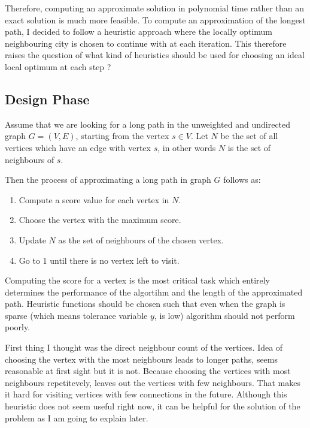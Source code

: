 \documentclass[12pt]{report}
\begin{document}
            Therefore, computing an approximate solution in polynomial time rather than an exact solution is much more feasible. To compute an approximation of the
            longest path, I decided to follow a heuristic approach where the locally optimum neighbouring city is chosen to continue with at each iteration. This therefore
            raises the question of what kind of heuristics should be used for choosing an ideal local optimum at each step ?

        \subsection{Design Phase}
            
            Assume that we are looking for a long path in the unweighted and undirected graph $G=(V,E)$, starting from the vertex $s \in V$. Let $N$ be the set of all vertices
            which have an edge with vertex $s$, in other words $N$ is the set of neighbours of $s$. 
            \newline

            Then the process of approximating a long path in graph $G$ follows as:

            \begin{enumerate}
                \item Compute a score value for each vertex in $N$.
                \item Choose the vertex with the maximum score.
                \item Update $N$ as the set of neighbours of the chosen vertex.
                \item Go to $1$ until there is no vertex left to visit.
            \end{enumerate}

            Computing the score for a vertex is the most critical task which entirely determines the performance of the algortihm and the length of the approximated path. 
            Heuristic functions should be chosen such that even when the graph is sparse (which means tolerance variable $y$, is low) algorithm should not perform poorly. 
            \newline

            First thing I thought was the direct neighbour count of the vertices. Idea of choosing the vertex with the most neighbours leads to longer paths, seems reasonable at 
            first sight but it is not. Because choosing the vertices with most neighbours repetitevely, leaves out the vertices with few neighbours. That makes it hard for visiting
            vertices with few connections in the future. Although this heuristic does not seem useful right now, it can be helpful for the solution of the problem as I am going to 
            explain later.
\end{document}
